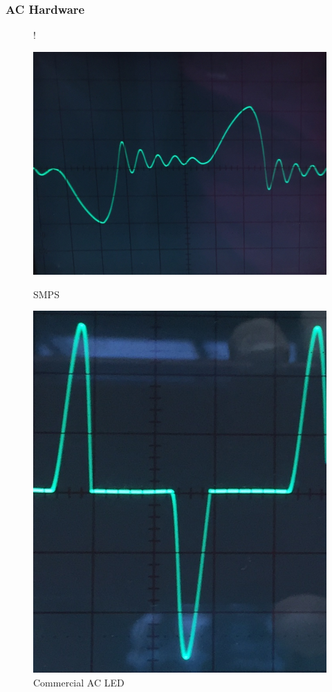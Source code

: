 \documentclass{beamer}
\begin{document}
	\begin{frame}\frametitle{AC Hardware}

		\begin{figure}
			 {!} {
			  \centering
			  \begin{minipage}[b]{0.48\textwidth}
			    \includegraphics[width=\textwidth]{../chapters/hardware-chapters/smps-current-primary-with-load-cropped.jpg}
			    \caption{SMPS}
			  \end{minipage}
			  \hfill
			  \begin{minipage}[b]{0.4\textwidth}
			    \includegraphics[width=\textwidth]{../chapters/hardware-chapters/commercial-230v-ac-led-on-cropped.png}
			    \caption{Commercial AC LED}
			  \end{minipage}
		  }
		\end{figure}


\end{frame}
\end{document}
